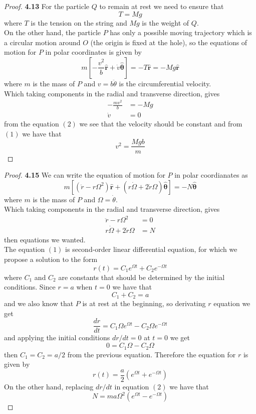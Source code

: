\documentclass[11pt]{article}
\newcommand{\hatr}{\bm{\hat{r}}}
\newcommand{\hatth}{\bm{\hat{\theta}}}
\theoremstyle{definition}
\begin{document}
    \begin{proof}{\textbf{4.13}}
        For the particle $Q$ to remain at rest we need to ensure that
        $$T = Mg$$
        where $T$ is the tension on the string and $Mg$ is the weight of $Q$.\\
        On the other hand, the particle $P$ has only a possible moving
        trajectory which is a circular motion around $O$ (the origin is fixed
        at the hole), so the equations of motion for $P$ in polar coordinates
        is given by
        $$m\left[-\frac{v^2}{b}\hatr + \dot{v}\hatth\right] = -T\hatr = -Mg\hatr$$
        where $m$ is the mass of $P$ and $v = b\ddot{\theta}$ is the
        circumferential velocity.\\
        Which taking components in the radial and transverse direction, gives
        \begin{align}
            -\frac{mv^2}{b} &= -Mg\\
            \dot{v} &= 0            
        \end{align}
        from the equation $(2)$ we see that the velocity should be constant and
        from $(1)$ we have that
        $$v^2 = \frac{Mgb}{m}$$
    \end{proof}
    \begin{proof}{\textbf{4.15}}
        We can write the equation of motion for $P$ in polar coordianates as
        $$m[(\ddot{r} - r\Omega^2)\hatr + (r\dot{\Omega} + 2\dot{r}\Omega)\hatth] = -N\hatth$$
        where $m$ is the mass of $P$ and $\Omega = \dot{\theta}$.\\
        Which taking components in the radial and transverse direction, gives
        \setcounter{equation}{0}%
        \begin{align}
            \ddot{r} - r\Omega^2 &= 0\\
            r\dot{\Omega} + 2\dot{r}\Omega &= N
        \end{align}
        then equations we wanted.\\
        The equation $(1)$ is second-order linear differential equation, for
        which we propose a solution to the form
        $$r(t) = C_1e^{\Omega t} + C_2e^{-\Omega t}$$
        where $C_1$ and $C_2$ are constants that should be determined by the
        initial conditions. Since $r=a$ when $t=0$ we have that
        $$C_1 + C_2 = a$$
        and we also know that $P$ is at rest at the beginning, so derivating
        $r$ equation we get
        $$\frac{dr}{dt} = C_1\Omega e^{\Omega t} - C_2\Omega e^{-\Omega t}$$
        and applying the initial conditions $dr/dt = 0$ at $t = 0$ we get
        $$0 = C_1\Omega - C_2\Omega$$
        then $C_1 = C_2 = a/2$ from the previous equation. Therefore the
        equation for $r$ is given by
        $$r(t) = \frac{a}{2}(e^{\Omega t} + e^{-\Omega t})$$
        On the other hand, replacing $dr/dt$ in equation $(2)$ we have that
        $$N = ma\Omega^2(e^{\Omega t} - e^{-\Omega t})$$
    \end{proof}
\end{document}
